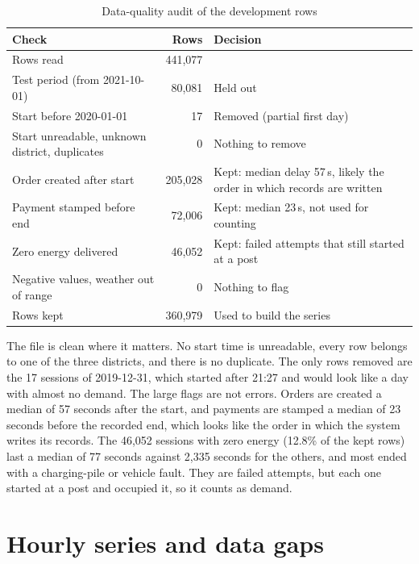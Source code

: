 \documentclass[12pt,a4paper,openany]{report}
\begin{document}
\begin{table}[!htb]
  \centering\small
  \caption{Data-quality audit of the development rows}
  \label{tab:audit}
  \begin{tabularx}{\textwidth}{>{\raggedright\arraybackslash}p{4.2cm}rL}
    \toprule
    Check & Rows & Decision \\
    \midrule
    Rows read & 441,077 & \\
    Test period (from 2021-10-01) & 80,081 & Held out \\
    Start before 2020-01-01 & 17 & Removed (partial first day) \\
    Start unreadable, unknown district, duplicates & 0 & Nothing to remove \\
    Order created after start & 205,028 & Kept: median delay 57\,s, likely the order in which records are written \\
    Payment stamped before end & 72,006 & Kept: median 23\,s, not used for counting \\
    Zero energy delivered & 46,052 & Kept: failed attempts that still started at a post \\
    Negative values, weather out of range & 0 & Nothing to flag \\
    \midrule
    Rows kept & 360,979 & Used to build the series \\
    \bottomrule
  \end{tabularx}
\end{table}

The file is clean where it matters. No start time is unreadable, every row belongs to one of the three districts,
and there is no duplicate. The only rows removed are the 17 sessions of 2019-12-31, which started after 21:27 and
would look like a day with almost no demand. The large flags are not errors. Orders are created a median of 57
seconds after the start, and payments are stamped a median of 23 seconds before the recorded end, which looks like
the order in which the system writes its records. The 46,052 sessions with zero energy (12.8\% of the kept rows)
last a median of 77 seconds against 2,335 seconds for the others, and most ended with a charging-pile or vehicle
fault. They are failed attempts, but each one started at a post and occupied it, so it counts as demand.

\section{Hourly series and data gaps}\label{sec:series}
\end{document}
